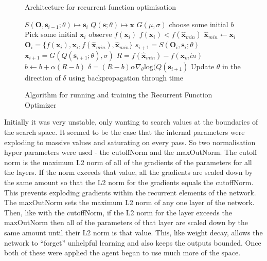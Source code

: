 \begin{figure}
\centering

\caption{Architecture for recurrent function optimisation}
\label{fig:RFOarch}
\end{figure}

\begin{figure}
\centering
\begin{minipage}{.8\textwidth}
\begin{algorithmic}
\State $S(\boldsymbol{O}, \boldsymbol{s}_{i-1}; \theta) \mapsto \boldsymbol{s}_i$
\State $Q(\boldsymbol{s} ;\theta) \mapsto \boldsymbol{x} $
\State $G(\mu,\sigma)$  
\State choose some initial $b$ 
 \Repeat
 	\State Pick some initial $\boldsymbol{x}_i$
 	\Repeat
 		\State observe $f(\boldsymbol{x}_i)$
 		\If $f(\boldsymbol{x}_i) < f(\hat{\boldsymbol{x}}_{min})$
 			\State$ \hat{\boldsymbol{x}}_{min} \gets \boldsymbol{x}_i$
 		\EndIf
 		\State $\boldsymbol{O}_i = \{f(\boldsymbol{x}_i),\boldsymbol{x}_i, f(\hat{\boldsymbol{x}}_{min}), \hat{\boldsymbol{x}}_{min}\} $
 		\State $s_{i+1} = S(\boldsymbol{O}_i, \boldsymbol{s}_{i}; \theta)$
 		\State $\boldsymbol{x}_{i+1} = G(Q(\boldsymbol{s}_{i+1};\theta),\sigma)$ 
	\State $R = f(\hat{\boldsymbol{x}}_{min}) - f(\boldsymbol{x}_min)$
	\State $b \gets b  + \alpha (R - b)$ 
	\State $\delta = (R - b) \alpha \nabla_\theta \text{log}(Q(\boldsymbol{s}_{i+1})$
	\State Update $\theta$ in the direction of $\delta$ using backpropagation through time
 \end{algorithmic}
 \end{minipage}
 \caption{Algorithm for running and training the Recurrent Function Optimizer}
 \label{alg:rfo}
\end{figure}

Initially it was very unstable, only wanting to search values at the boundaries of the search space. It seemed to be the case that the internal parameters were exploding to massive values and saturating on every pass. So two normalisation hyper parameters were used - the cutoffNorm and the maxOutNorm. The cutoff norm is the maximum L2 norm of all of the gradients of the parameters for all the layers. If the norm exceeds that value, all the gradients are scaled down by the same amount so that the L2 norm for the gradients equals the cutoffNorm. This prevents exploding gradients within the recurrent elements of the network. The maxOutNorm sets the maximum L2 norm of any one layer of the network. Then, like with the cutoffNorm, if the L2 norm for the layer exceeds the maxOutNorm then all of the parameters of that layer are scaled down by the same amount until their L2 norm is that value. This, like weight decay, allows the network to ``forget'' unhelpful learning and also keeps the outputs bounded. Once both of these were applied the agent began to use much more of the space.

